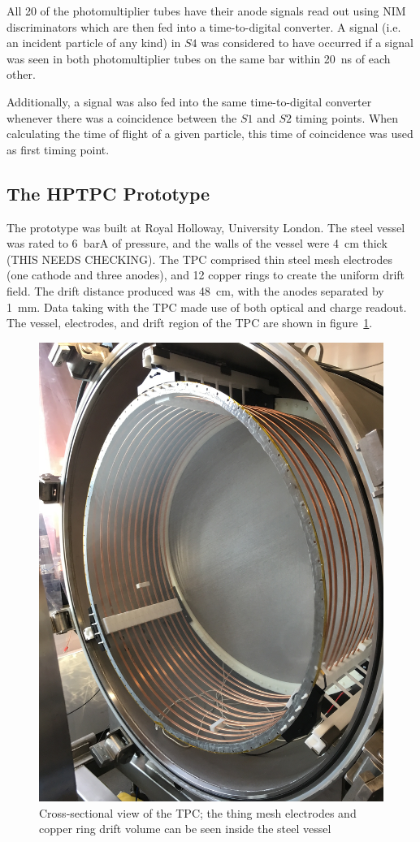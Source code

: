     All 20 of the photomultiplier tubes have their anode signals read out using NIM discriminators which are then fed into a time-to-digital converter. 
    A signal (i.e. an incident particle of any kind) in $S4$ was considered to have occurred if a signal was seen in both photomultiplier tubes on the same bar within 20~ns of each other.
    
    Additionally, a signal was also fed into the same time-to-digital converter whenever there was a coincidence between the $S1$ and $S2$ timing points. 
    When calculating the time of flight of a given particle, this time of coincidence was used as first timing point.
    
    \subsection{The HPTPC Prototype}
    The prototype was built at Royal Holloway, University London.
    The steel vessel was rated to 6~barA of pressure, and the walls of the vessel were 4~cm thick (THIS NEEDS CHECKING).
    The TPC comprised thin steel mesh electrodes (one cathode and three anodes), and 12 copper rings to create the uniform drift field.
    The drift distance produced was 48~cm, with the anodes separated by 1~mm.
    Data taking with the TPC made use of both optical and charge readout.
    The vessel, electrodes, and drift region of the TPC are shown in figure~\ref{fig:TPC}.
    
     \begin{figure}
      \centering
    \includegraphics[width=0.6\linewidth]{files/Figures/IMG_1194.jpg}
    	\caption{Cross-sectional view of the TPC; the thing mesh electrodes and copper ring drift volume can be seen inside the steel vessel}
    		\label{fig:TPC}
    \end{figure}
    
